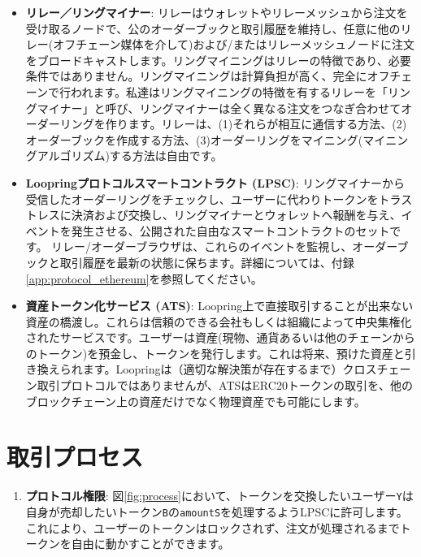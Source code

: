 \documentclass{article}
\begin{document}
\begin{multicols}{2}
\begin{itemize}
\item \textbf{リレー／リングマイナー}: リレーはウォレットやリレーメッシュから注文を受け取るノードで、公のオーダーブックと取引履歴を維持し、任意に他のリレー(オフチェーン媒体を介して)および/またはリレーメッシュノードに注文をブロードキャストします。リングマイニングはリレーの特徴であり、必要条件ではありません。リングマイニングは計算負担が高く、完全にオフチェーンで行われます。私達はリングマイニングの特徴を有するリレーを「リングマイナー」と呼び、リングマイナーは全く異なる注文をつなぎ合わせてオーダーリングを作ります。リレーは、(1)それらが相互に通信する方法、(2)オーダーブックを作成する方法、(3)オーダーリングをマイニング(マイニングアルゴリズム)する方法は自由です。

\item \textbf{Loopringプロトコルスマートコントラクト (LPSC)}: リングマイナーから受信したオーダーリングをチェックし、ユーザーに代わりトークンをトラストレスに決済および交換し、リングマイナーとウォレットへ報酬を与え、イベントを発生させる、公開された自由なスマートコントラクトのセットです。 リレー/オーダーブラウザは、これらのイベントを監視し、オーダーブックと取引履歴を最新の状態に保ちます。詳細については、付録\ref{app:protocol_ethereum}を参照してください。

\item \textbf{資産トークン化サービス (ATS)}: Loopring上で直接取引することが出来ない資産の橋渡し。これらは信頼のできる会社もしくは組織によって中央集権化されたサービスです。ユーザーは資産(現物、通貨あるいは他のチェーンからのトークン)を預金し、トークンを発行します。これは将来、預けた資産と引き換えられます。Loopringは（適切な解決策が存在するまで）クロスチェーン取引プロトコルではありませんが、ATSはERC20トークン\cite{ERC20}の取引を、他のブロックチェーン上の資産だけでなく物理資産でも可能にします。

\end{itemize}


\section{取引プロセス\label{sec:process}}



\begin{enumerate} 


\item \textbf{プロトコル権限}: 図\ref{fig:process}において、トークンを交換したいユーザー\verb|Y|は自身が売却したいトークン\verb|B|の\verb|amountS|を処理するようLPSCに許可します。これにより、ユーザーのトークンはロックされず、注文が処理されるまでトークンを自由に動かすことができます。


\end{enumerate}
\end{multicols}
\end{document}
